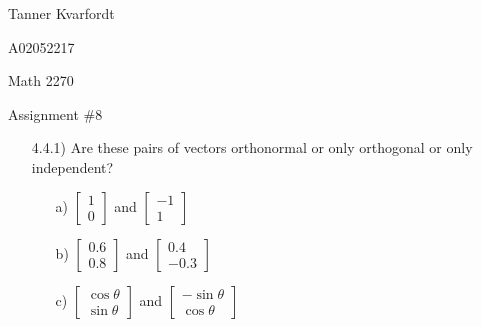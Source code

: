 \documentclass[12pt,pdftex]{article}
\begin{document}
\hfill Tanner Kvarfordt

\hfill A02052217

\hfill Math 2270

\hfill Assignment \#8


\begin{itemize}
\item[4.4.1)] Are these pairs of vectors orthonormal or only orthogonal or only independent?
\begin{itemize}
\item[a)] $\left[\begin{array}{c} 1 \\ 0\end{array}\right]$ and $\left[\begin{array}{c} -1 \\ 1\end{array}\right]$
\item[b)] $\left[\begin{array}{c} 0.6 \\ 0.8\end{array}\right]$ and $\left[\begin{array}{r}0.4\\-0.3\end{array}\right]$
\item[c)] $\left[\begin{array}{c} \cos\theta \\ \sin\theta \end{array}\right]$ and 
          $\left[\begin{array}{r} -\sin\theta \\ \cos\theta \end{array}\right]$
\end{itemize}


\end{itemize}
\end{document}
